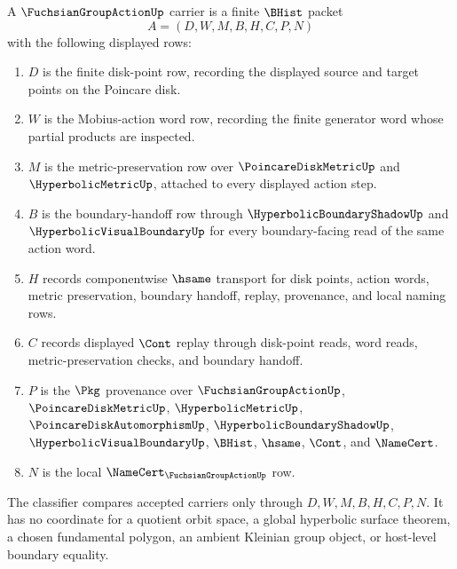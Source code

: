 \begin{definition}
\label{def:fuchsian-group-action-carrier}
A $\FuchsianGroupActionUp$ carrier is a finite $\BHist$ packet
$$
A=(D,W,M,B,H,C,P,N)
$$
with the following displayed rows:
\begin{enumerate}
\item $D$ is the finite disk-point row, recording the displayed source and target points on the Poincare disk.
\item $W$ is the Mobius-action word row, recording the finite generator word whose partial products are inspected.
\item $M$ is the metric-preservation row over $\PoincareDiskMetricUp$ and $\HyperbolicMetricUp$, attached to every displayed action step.
\item $B$ is the boundary-handoff row through $\HyperbolicBoundaryShadowUp$ and $\HyperbolicVisualBoundaryUp$ for every boundary-facing read of the same action word.
\item $H$ records componentwise $\hsame$ transport for disk points, action words, metric preservation, boundary handoff, replay, provenance, and local naming rows.
\item $C$ records displayed $\Cont$ replay through disk-point reads, word reads, metric-preservation checks, and boundary handoff.
\item $P$ is the $\Pkg$ provenance over $\FuchsianGroupActionUp$, $\PoincareDiskMetricUp$, $\HyperbolicMetricUp$, $\PoincareDiskAutomorphismUp$, $\HyperbolicBoundaryShadowUp$, $\HyperbolicVisualBoundaryUp$, $\BHist$, $\hsame$, $\Cont$, and $\NameCert$.
\item $N$ is the local $\NameCert_{\FuchsianGroupActionUp}$ row.
\end{enumerate}
The classifier compares accepted carriers only through $D,W,M,B,H,C,P,N$. It has no coordinate for a quotient orbit space, a global hyperbolic surface theorem, a chosen fundamental polygon, an ambient Kleinian group object, or host-level boundary equality.
\end{definition}

